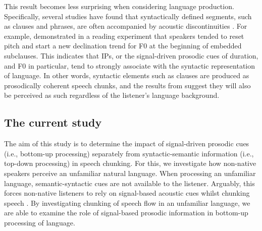\documentclass[output=paper]{langscibook}
\begin{document}
	This result becomes less surprising when considering language production. Specifically, several studies have found that syntactically defined segments, such as clauses and phrases, are often accompanied by acoustic discontinuities \citep[see, e.g.,][]{cutlerEtAl1997, petroneEtAl2017}. For example, \citet{feryIshihara2009} demonstrated in a reading experiment that speakers tended to reset pitch and start a new declination trend for F0 at the beginning of embedded subclauses. This indicates that IPs, or the signal-driven prosodic cues of duration, and F0 in particular, tend to strongly associate with the syntactic representation of language. In other words, syntactic elements such as clauses are produced as prosodically coherent speech chunks, and the results from \citet[][]{riesbergEtAl2020} suggest they will also be perceived as such regardless of the listener’s language background.
	
	\subsection{The current study}

    The aim of this study is to determine the impact of signal-driven prosodic cues (i.e., bottom-up processing) separately from syntactic-semantic information (i.e., top-down processing) in speech chunking. For this, we investigate how non-native speakers perceive an unfamiliar natural language. When processing an unfamiliar language, semantic-syntactic cues are not available to the listener. Arguably, this forces non-native listeners to rely on signal-based acoustic cues whilst chunking speech \citep[][]{himmelmannEtAl2018, riesbergEtAl2020}. By investigating chunking of speech flow in an unfamiliar language, we are able to examine the role of signal-based prosodic information in bottom-up processing of language.
\end{document}
